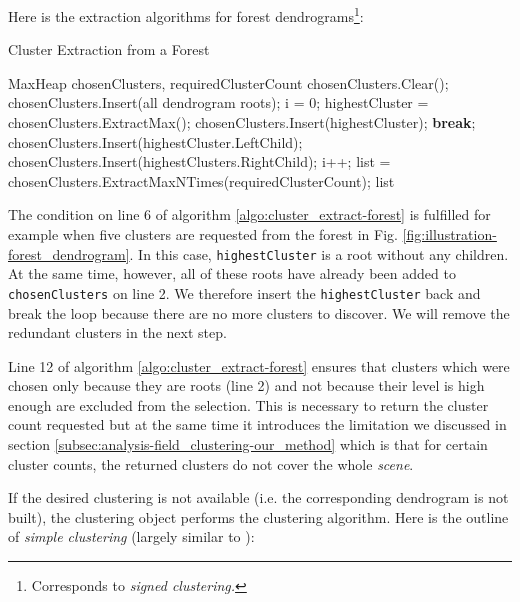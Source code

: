 Here is the extraction algorithms for forest dendrograms\footnote{Corresponds to {\it signed clustering.}}:

\begin{algorithm}[H]
\caption{Cluster Extraction from a Forest}
\label{algo:cluster_extract-forest}
\begin{algorithmic}[1]

\Require MaxHeap chosenClusters, requiredClusterCount
\Statex
\State chosenClusters.Clear();
\State chosenClusters.Insert(all dendrogram roots);
\State i = 0;
	\State highestCluster = chosenClusters.ExtractMax();
		\State chosenClusters.Insert(highestCluster);
		\State \textbf{break};
	\EndIf
    \State chosenClusters.Insert(highestCluster.LeftChild);
    \State chosenClusters.Insert(highestClusters.RightChild);
    \State i++;
\EndWhile
\State list = chosenClusters.ExtractMaxNTimes(requiredClusterCount);
\Statex
\Return list
\end{algorithmic}
\end{algorithm}

The condition on line 6 of algorithm \ref{algo:cluster_extract-forest} is fulfilled for example when five clusters are requested from the forest in Fig. \ref{fig:illustration-forest_dendrogram}. In this case, \verb+highestCluster+ is a root without any children. At the same time, however, all of these roots have already been added to \verb+chosenClusters+ on line 2. We therefore insert the \verb+highestCluster+ back and break the loop because there are no more clusters to discover. We will remove the redundant clusters in the next step.

Line 12 of algorithm \ref{algo:cluster_extract-forest} ensures that clusters which were chosen only because they are roots (line 2) and not because their level is high enough are excluded from the selection. This is necessary to return the cluster count requested but at the same time it introduces the limitation we discussed in section \ref{subsec:analysis-field_clustering-our_method} which is that for certain cluster counts, the returned clusters do not cover the whole {\it scene}.

If the desired clustering is not available (i.e. the corresponding dendrogram is not built), the clustering object performs the clustering algorithm. Here is the outline of {\it simple clustering} (largely similar to \citet{Telea99}):

